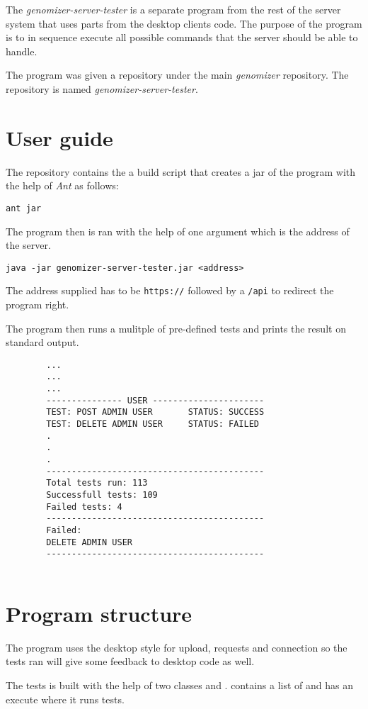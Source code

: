 The \textit{genomizer-server-tester} is a separate program from the rest of the server system that uses parts from
the desktop clients code. The purpose of the program is to in sequence execute all possible commands that the server should be able to handle.

The program was given a repository under the main \textit{genomizer} repository. The repository is named \textit{genomizer-server-tester}. 

\section{User guide}
The repository contains the a build script that creates a jar of the program with the help of \textit{Ant} as follows:
\begin{verbatim}
ant jar
\end{verbatim}

The program then is ran with the help of one argument which is the address of the server.
\begin{verbatim}
java -jar genomizer-server-tester.jar <address>
\end{verbatim}

The address supplied has to be \texttt{https://} followed by a \texttt{/api} to redirect the program right.

The program then runs a mulitple of pre-defined tests and prints the result on standard output.

\begin{example}
	\begin{verbatim}
		...
		...
		...
		--------------- USER ----------------------
		TEST: POST ADMIN USER 		STATUS: SUCCESS
		TEST: DELETE ADMIN USER     STATUS: FAILED
		.
		.
		.
		-------------------------------------------
		Total tests run: 113
		Successfull tests: 109
		Failed tests: 4
		-------------------------------------------
		Failed:
		DELETE ADMIN USER
		-------------------------------------------
		
	\end{verbatim}
\end{example}


\section{Program structure}
The program uses the desktop style for upload, requests and connection so the tests ran will give some feedback to desktop code as well.

The tests is built with the help of two classes  and .
 contains a list of  and has an execute where it runs tests.

